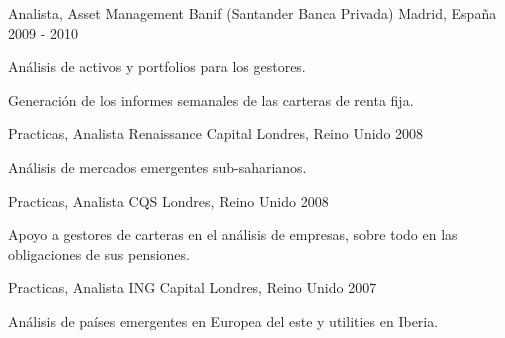 \begin{cventries}
\cventry
    {Analista, Asset Management} %
    {Banif (Santander Banca Privada)} %
    {Madrid, España} %
    {2009 - 2010} %
    {
        \begin{cvitems} %
            \item {Análisis de activos y portfolios para los gestores.}
            \item {Generación de los informes semanales de las carteras de renta fija.}
        \end{cvitems}
    }

\cventry
    {Practicas, Analista} %
    {Renaissance Capital} %
    {Londres, Reino Unido} %
    {2008} %
    {
        \begin{cvitems} %
            \item {Análisis de mercados emergentes sub-saharianos.}
        \end{cvitems}
    }

\cventry
    {Practicas, Analista} %
    {CQS} %
    {Londres, Reino Unido} %
    {2008} %
    {
        \begin{cvitems} %
            \item {Apoyo a gestores de carteras en el análisis de empresas, sobre todo en las obligaciones de sus pensiones.}
        \end{cvitems}
    }

\cventry
    {Practicas, Analista} %
    {ING Capital} %
    {Londres, Reino Unido} %
    {2007} %
    {
        \begin{cvitems} %
            \item {Análisis de países emergentes en Europea del este y utilities en Iberia.}
        \end{cvitems}
    }

\end{cventries}

